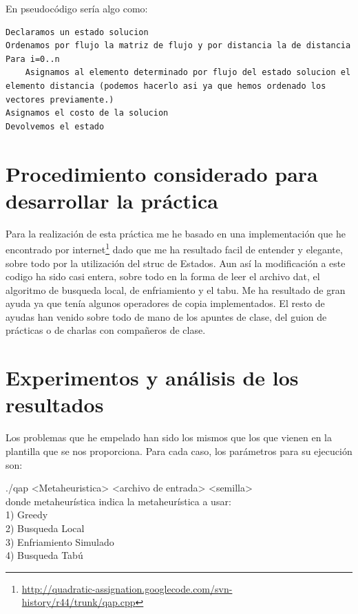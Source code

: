 En pseudocódigo sería algo como:

\begin{lstlisting}[language=SH]
Declaramos un estado solucion
Ordenamos por flujo la matriz de flujo y por distancia la de distancia
Para i=0..n
	Asignamos al elemento determinado por flujo del estado solucion el elemento distancia (podemos hacerlo asi ya que hemos ordenado los vectores previamente.)
Asignamos el costo de la solucion
Devolvemos el estado

\end{lstlisting}

\section{Procedimiento considerado para desarrollar la práctica}
Para la realización de esta práctica me he basado en una implementación que he encontrado por internet\footnote{\url{http://quadratic-assignation.googlecode.com/svn-history/r44/trunk/qap.cpp}} dado que me ha resultado facil de entender y elegante, sobre todo por la utilización del struc de Estados. Aun así la modificación a este codigo ha sido casi entera, sobre todo en la forma de leer el archivo dat, el algoritmo de busqueda local, de enfriamiento y el tabu. Me ha resultado de gran ayuda ya que tenía algunos operadores de copia implementados. El resto de ayudas han venido sobre todo de mano de los apuntes de clase, del guion de prácticas o de charlas con compañeros de clase.

\section{Experimentos y análisis de los resultados}

Los problemas que he empelado han sido los mismos que los que vienen en la plantilla que se nos proporciona. Para cada caso, los parámetros para su ejecución son:

./qap <Metaheuristica> <archivo de entrada> <semilla>\\

donde metaheurística indica la metaheurística a usar:\\
1) Greedy\\
2) Busqueda Local\\
3) Enfriamiento Simulado\\
4) Busqueda Tabú\\

